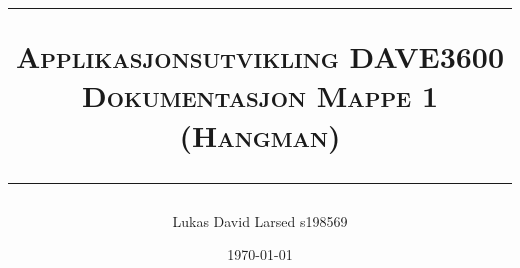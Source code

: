\begin{titlepage}
 



\title{
\rule{\linewidth}{0.5mm}
\textsc{\LARGE Applikasjonsutvikling DAVE3600\\ \large Dokumentasjon Mappe 1 (Hangman)}
\rule{\linewidth}{0.5mm}
}





\author{\LARGE Lukas David Larsed s198569\\}



\date{\today}



\end{titlepage}
